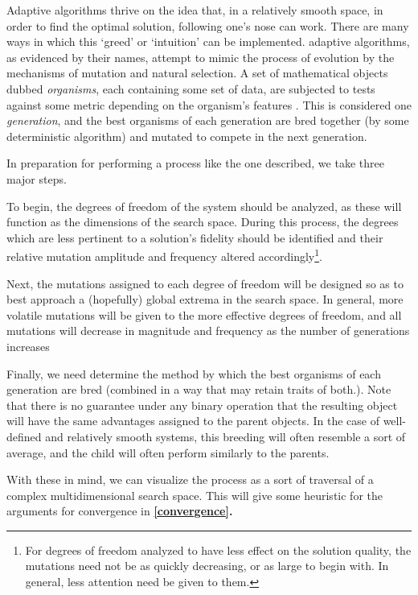 \documentclass[11pt,twocolumn]{article}
\begin{document}
	Adaptive algorithms thrive on the idea that, in a relatively smooth space, in order to find the optimal solution, following one's nose can work. There are many ways in which this `greed' or `intuition' can be implemented. adaptive algorithms, as evidenced by their names, attempt to mimic the process of evolution by the mechanisms of mutation and natural selection. A set of mathematical objects dubbed \emph{organisms}, each containing some set of data, are subjected to tests against some metric depending on the organism's features \cite{weise}. This is considered one \emph{generation}, and the best organisms of each generation are bred together (by some deterministic algorithm) and mutated to compete in the next generation.

	In preparation for performing a process like the one described, we take three major steps.
	
	To begin, the degrees of freedom of the system should be analyzed, as these will function as the dimensions of the search space. During this process, the degrees which are less pertinent to a solution's fidelity should be identified and their relative mutation amplitude and frequency altered accordingly\footnote{For degrees of freedom analyzed to have less effect on the solution quality, the mutations need not be as quickly decreasing, or as large to begin with. In general, less attention need be given to them.}.

	Next, the mutations assigned to each degree of freedom will be designed so as to best approach a (hopefully) global extrema in the search space. In general, more volatile mutations will be given to the more effective degrees of freedom, and all mutations will decrease in magnitude and frequency as the number of generations increases \cite{satsangi}

	Finally, we need determine the method by which the best organisms of each generation are bred (combined in a way that may retain traits of both.). Note that there is no guarantee under any binary operation that the resulting object will have the same advantages assigned to the parent objects. In the case of well-defined and relatively smooth systems, this breeding will often resemble a sort of average, and the child will often perform similarly to the parents. 

	With these in mind, we can visualize the process as a sort of traversal of a complex multidimensional search space. This will give some heuristic for the arguments for convergence in \textbf{\ref{convergence}.}
\end{document}
